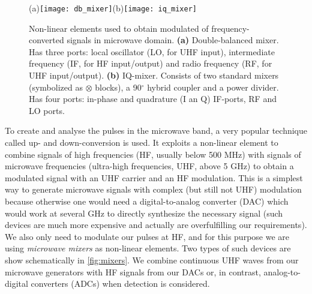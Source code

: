 \begin{figure}
\centering
\large (a)\texttt{[image: db\_mixer]}\quad (b)\texttt{[image: iq\_mixer]}
\caption{Non-linear elements used to obtain modulated of frequency-converted signals in microwave domain. \textbf{(a)} Double-balanced mixer. Has three ports: local oscillator (LO, for UHF input), intermediate frequency (IF, for HF input/output) and radio frequency (RF, for UHF input/output). \textbf{(b)} IQ-mixer. Consists of two standard mixers (symbolized as $\otimes$ blocks), a 90$^\circ$ hybrid coupler and a power divider. Has four ports: in-phase and quadrature (I an Q) IF-ports, RF and LO ports.}
\label{fig:mixers}
\end{figure}

To create and analyse the pulses in the microwave band, a very popular technique called up- and down-conversion is used.  It exploits a non-linear element to combine signals of high frequencies (HF, usually below 500 MHz) with signals of microwave frequencies (ultra-high frequencies, UHF, above 5 GHz) to obtain a modulated signal with an UHF carrier and an HF modulation. This is a simplest way to generate microwave signals with complex (but still not UHF) modulation because otherwise one would need a digital-to-analog converter (DAC) which would work at several GHz to directly synthesize the necessary signal (such devices are much more expensive and actually are overfulfilling our requirements). We also only need to modulate our pulses at HF, and for this purpose we are using \textit{microwave mixers} as non-linear elements. Two types of such devices are show schematically in \autoref{fig:mixers}. We combine continuous UHF waves from our microwave generators with HF signals from our DACs or, in contrast, analog-to-digital converters (ADCs) when detection is considered. 

